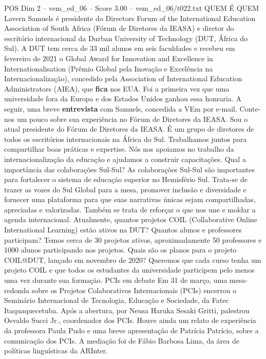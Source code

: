 \begin{textsample}{POS Dim 2 – vem\_ed\_06 – Score 3.00 – vem\_ed\_06/t022.txt}  \label{ex:f2_pos_097}
QUEM É QUEM Lavern Samuels é presidente do Directors Forum of the International Education Association of South Africa (Fórum de Diretores da IEASA) e diretor do escritório internacional da Durban University of Technology (DUT, África do Sul).
A DUT tem cerca de 33 mil alunos em seis faculdades e recebeu em fevereiro de 2021 o Global Award for Innovation and Excellence in Internationalisation (Prêmio Global pela Inovação e Excelência na Internacionalização), concedido pela Association of International Education Administrators (AIEA), que \textbf{fica} nos EUA.
Foi a primeira vez que uma universidade fora da Europa e dos Estados Unidos ganhou essa honraria.
A seguir, uma breve \textbf{entrevista} com Samuels, concedida a VEm por e-mail.
Conte-nos um pouco sobre sua experiência no Fórum de Diretores da IEASA.
Sou o atual presidente do Fórum de Diretores da IEASA.
É um grupo de diretores de todos os escritórios internacionais na África do Sul.
Trabalhamos juntos para compartilhar boas práticas e expertise.
Nós nos apoiamos no trabalho da internacionalização da educação e ajudamos a construir capacitações.
Qual a importância das colaborações Sul-Sul?
As colaborações Sul-Sul são importantes para fortalecer o sistema de educação superior no Hemisfério Sul.
Trata-se de trazer as vozes do Sul Global para a mesa, promover inclusão e diversidade e fornecer uma plataforma para que suas narrativas únicas sejam compartilhadas, apreciadas e valorizadas.
Também se trata de reforçar o que nos une e moldar a agenda internacional.
Atualmente, quantos projetos COIL (Collaborative Online International Learning) estão ativos na DUT?
Quantos alunos e professores participam?
Temos cerca de 30 projetos ativos, aproximadamente 50 professores e 1000 alunos participando nos projetos.
Quais são os planos para o projeto COIL@DUT, lançado em novembro de 2020?
Queremos que cada curso tenha um projeto COIL e que todos os estudantes da universidade participem pelo menos uma vez durante sua formação.
PCIs em debate Em 31 de março, uma mesa-redonda sobre os Projetos Colaborativos Internacionais (PCIs) encerrou o Seminário Internacional de Tecnologia, Educação e Sociedade, da Fatec Itaquaquecetuba.
Após a abertura, por Neusa Haruka Sesaki Gritti, palestrou Osvaldo Succi Jr., coordenador dos PCIs.
Houve ainda um relato de experiência da professora Paula Pudo e uma breve apresentação de Patrícia Patrício, sobre a comunicação dos PCIs.
A mediação foi de Fábio Barbosa Lima, da área de políticas linguísticas da ARInter.

\end{textsample}
